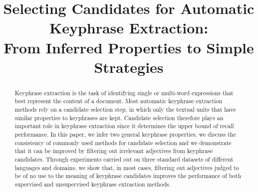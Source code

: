 \documentclass[11pt,letterpaper]{article}
\title{
  Selecting Candidates for Automatic Keyphrase Extraction:\\
  From Inferred Properties to Simple Strategies
}
\author{
}
\date{}
\begin{document}
  \maketitle
  \begin{abstract}
    Keyphrase extraction is the task of identifying single or multi-word
    expressions that best represent the content of a document. Most automatic
    keyphrase extraction methods rely on a candidate selection step, in which
    only the textual units that have similar properties to keyphrases are kept.
    Candidate selection therefore plays an important role in keyphrase
    extraction since it determines the upper bound of recall performance. In
    this paper, we infer two general keyphrase properties, we discuss the
    consistency of commonly used methods for candidate selection and we
    demonstrate that it can be improved by filtering out irrelevant adjectives
    from keyphrase candidates. Through experiments carried out on three standard
    datasets of different languages and domains, we show that, in most cases,
    filtering out adjectives judged to be of no use to the meaning of keyphrase
    candidates improves the performance of both supervised and unsupervised
    keyphrase extraction methods. 
  \end{abstract}

  


  
  
\end{document}
